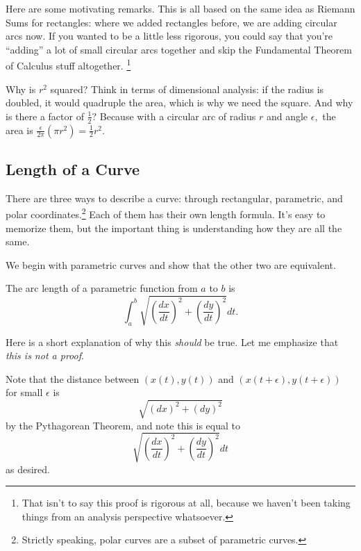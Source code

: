 \documentclass[mast]{lucky}
\begin{document}
Here are some motivating remarks. This is all based on the same idea as Riemann Sums for rectangles: where we added rectangles before, we are adding circular arcs now. If you wanted to be a little less rigorous, you could say that you're ``adding'' a lot of small circular arcs together and skip the Fundamental Theorem of Calculus stuff altogether. \footnote{That isn't to say this proof is rigorous at all, because we haven't been taking things from an analysis perspective whatsoever.}

Why is $r^2$ squared? Think in terms of dimensional analysis: if the radius is doubled, it would quadruple the area, which is why we need the square. And why is there a factor of $\frac{1}{2}?$ Because with a circular arc of radius $r$ and angle $\epsilon,$ the area is $\frac{\epsilon}{2\pi}(\pi r^2)=\frac{1}{2}r^2.$



\subsection{Length of a Curve}

There are three ways to describe a curve: through rectangular, parametric, and polar coordinates.\footnote{Strictly speaking, polar curves are a subset of parametric curves.} Each of them has their own length formula. It's easy to memorize them, but the important thing is understanding how they are all the same.

We begin with parametric curves and show that the other two are equivalent.

\begin{theo}
The arc length of a parametric function from $a$ to $b$ is
\[\int_a^b \sqrt{\left(\frac{dx}{dt}\right)^2+\left(\frac{dy}{dt}\right)^2}dt.\]
\end{theo}

Here is a short explanation of why this \textit{should} be true. Let me emphasize that \emph{this is not a proof}.

Note that the distance between $(x(t),y(t))$ and $(x(t+\epsilon),y(t+\epsilon))$ for small $\epsilon$ is
\[\sqrt{(dx)^2+(dy)^2}\]
by the Pythagorean Theorem, and note this is equal to
\[\sqrt{\left(\frac{dx}{dt}\right)^2+\left(\frac{dy}{dt}\right)^2}dt\]
as desired.
\end{document}
